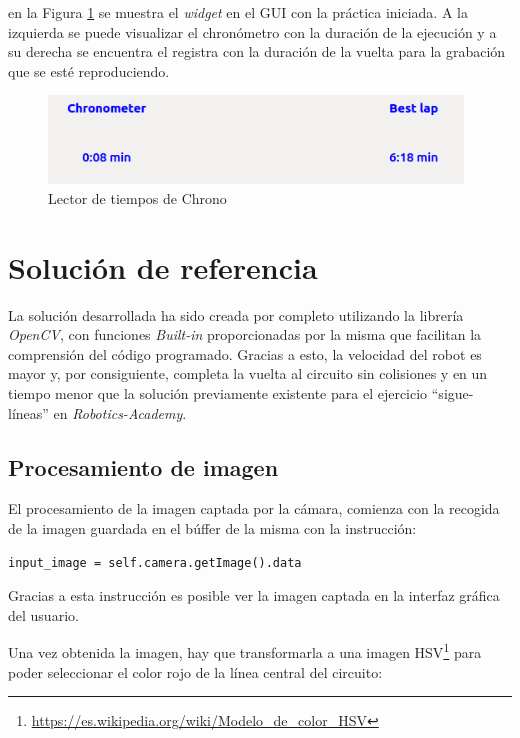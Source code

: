 en la Figura \ref{fig.ltch} se muestra el \textit{widget} en el GUI con la práctica iniciada. A la izquierda se puede visualizar el chronómetro con la duración de la ejecución y a su derecha se encuentra el registra con la duración de la vuelta para la grabación que se esté reproduciendo.

\begin{figure}[H]
  \begin{center}
    \includegraphics[width=0.98\textwidth]{figures/lector_tiempos_chrono.png}
		\caption{Lector de tiempos de Chrono}
		\label{fig.ltch}
		\end{center}
\end{figure}

\section{Solución de referencia}
La solución desarrollada ha sido creada por completo utilizando la librería \textit{OpenCV}, con funciones \textit{Built-in} proporcionadas por la misma que facilitan la comprensión del código programado. Gracias a esto, la velocidad del robot es mayor y, por consiguiente, completa la vuelta al circuito sin colisiones y en un tiempo menor que la solución previamente existente para el ejercicio ``sigue-líneas'' en \textit{Robotics-Academy}.

\subsection{Procesamiento de imagen} \label{sec.pdi}
El procesamiento de la imagen captada por la cámara, comienza con la recogida de la imagen guardada en el búffer de la misma con la instrucción:

\lstset{language=Python, breaklines=true, basicstyle=\footnotesize}
\begin{lstlisting}[frame=single]
input_image = self.camera.getImage().data
\end{lstlisting}

Gracias a esta instrucción es posible ver la imagen captada en la interfaz gráfica del usuario.

Una vez obtenida la imagen, hay que transformarla a una imagen HSV\footnote{\url{https://es.wikipedia.org/wiki/Modelo_de_color_HSV}} para poder seleccionar el color rojo de la línea central del circuito:

